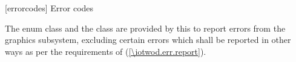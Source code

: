 
 [errorcodes] {Error codes}

\pnum
The  enum class and the  class are provided by this \documenttypename{} to report errors from the graphics subsystem, excluding certain errors which shall be reported in other ways as per the requirements of (\ref{\iotwod.err.report}).

\addtocounter{SectionDepthBase}{1}


\addtocounter{SectionDepthBase}{-1}
